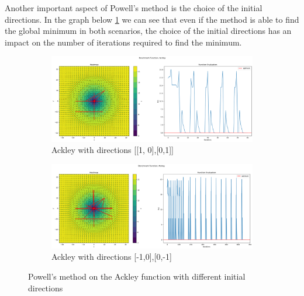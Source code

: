 Another important aspect of Powell's method is the choice of the initial directions. In the graph below \ref{fig:ackley} we can see that even if the method is able to find the global minimum in both scenarios, the choice of the initial directions has an impact on the number of iterations required to find the minimum.

\begin{figure}[H]
    \begin{subfigure}{0.5\textwidth}
        \includegraphics[width=\textwidth]{lab1/imgs/pw_ackley.png}
        \caption{Ackley with directions [[1, 0],[0,1]]}
    \end{subfigure}
    \begin{subfigure}{0.5\textwidth}
        \includegraphics[width=\textwidth]{lab1/imgs/pw_ackley_opposite.png}
        \caption{Ackley with directions [-1,0],[0,-1]}
    \end{subfigure}
    \caption{Powell's method on the Ackley function with different initial directions}
    \label{fig:ackley}
\end{figure}

